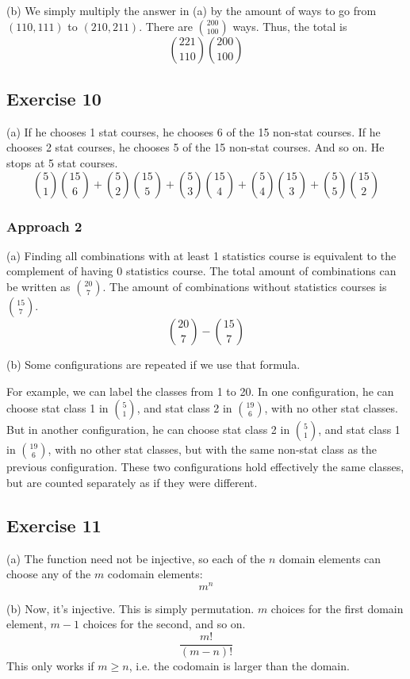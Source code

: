 \documentclass{book}
\begin{document}
\noindent
(b) We simply multiply the answer in (a) by the amount of ways to go from $(110, 111)$ to $(210, 211)$. There are $\binom{200}{100}$ ways. Thus, the total is
$$\binom{221}{110} \binom{200}{100}$$

\subsection*{Exercise 10}
(a) If he chooses 1 stat courses, he chooses 6 of the 15 non-stat courses. If he chooses 2 stat courses, he chooses 5 of the 15 non-stat courses. And so on. He stops at 5 stat courses.
$$\binom{5}{1}\binom{15}{6} + \binom{5}{2}\binom{15}{5} + \binom{5}{3}\binom{15}{4} + \binom{5}{4}\binom{15}{3} + \binom{5}{5}\binom{15}{2}$$

\subsubsection*{Approach 2}
(a) Finding all combinations with at least 1 statistics course is equivalent to the complement of having 0 statistics course. The total amount of combinations can be written as $\binom{20}{7}$. The amount of combinations without statistics courses is $\binom{15}{7}$.
$$\binom{20}{7} - \binom{15}{7}$$

\noindent
(b) Some configurations are repeated if we use that formula.

For example, we can label the classes from 1 to 20. In one configuration, he can choose stat class 1 in $\binom{5}{1}$, and stat class 2 in $\binom{19}{6}$, with no other stat classes. But in another configuration, he can choose stat class 2 in $\binom{5}{1}$, and stat class 1 in $\binom{19}{6}$, with no other stat classes, but with the same non-stat class as the previous configuration. These two configurations hold effectively the same classes, but are counted separately as if they were different.

\subsection*{Exercise 11}
(a) The function need not be injective, so each of the $n$ domain elements can choose any of the $m$ codomain elements:
$$m^n$$

\noindent
(b) Now, it's injective. This is simply permutation. $m$ choices for the first domain element, $m - 1$ choices for the second, and so on.
$$\frac{m!}{(m - n)!}$$
This only works if $m \geq n$, i.e. the codomain is larger than the domain.
\end{document}
